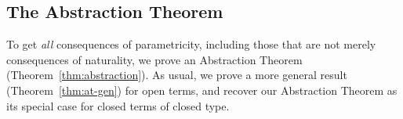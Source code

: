 \documentclass[runningheads]{llncs}
\newcommand{\set}{\mathsf{Set}}
\newcommand{\map}{\mathsf{map}}
\begin{document}
\begin{comment}
So, we can conclude that
\begin{equation}
\map_{\setsem{\Gamma; \ol\alpha \vdash G} \rho[\ol{\alpha := \_}]} \ol{y}
  \circ 
  x_{\ol{{\setsem{\Gamma; \emptyset \vdash \sigma} \rho}}}
= x_{\ol{\setsem{\Gamma; \emptyset \vdash \tau} \rho} }
\circ \map_{\setsem{\Gamma; \ol\alpha \vdash F} 
  \rho[\ol{\alpha := \_}]} \, \ol{y}
\end{equation}

Moreover, for any $\ol{A, B: \set}$,
we can choose $\ol{\sigma = v}$ and $\ol{\tau = w}$ to be variables such that
$\ol{\rho v = A}$ and $\ol{\rho w = B}$.
Then for any functions $\ol{f : A \to B}$ we have that
\begin{equation}
\map_{\setsem{\Gamma; \ol\alpha \vdash G} \rho[\ol{\alpha := \_}]} \ol{f}
  \circ 
  x_{\ol{A}}
  = x_{\ol{B}}
\circ \map_{\setsem{\Gamma; \ol\alpha \vdash F} 
  \rho[\ol{\alpha := \_}]} \, \ol{f}
\end{equation}
\end{proof}
\end{comment}

\vspace*{-0.1in}

\subsection{The Abstraction Theorem}\label{sec:thms} 

To get {\em all} consequences of parametricity, including those that
are not merely consequences of naturality, we prove an Abstraction
Theorem (Theorem~\ref{thm:abstraction}). As usual, %
we prove a more general result (Theorem~\ref{thm:at-gen}) for %
open terms, and recover our Abstraction Theorem as its special case
for closed terms of closed type.

\vspace*{-0.05in}
\end{document}
